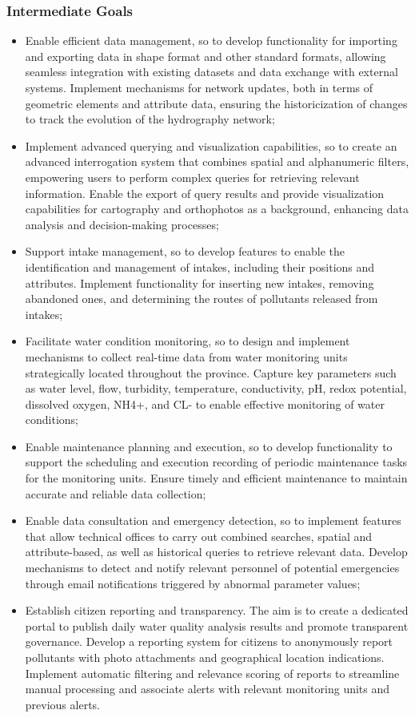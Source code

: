 \subsubsection{Intermediate Goals}
\begin{itemize}
    \item Enable efficient data management, so to develop functionality for importing and exporting data in shape format and other standard formats, allowing seamless integration with existing datasets and data exchange with external systems. Implement mechanisms for network updates, both in terms of geometric elements and attribute data, ensuring the historicization of changes to track the evolution of the hydrography network;
    \item Implement advanced querying and visualization capabilities, so to create an advanced interrogation system that combines spatial and alphanumeric filters, empowering users to perform complex queries for retrieving relevant information. Enable the export of query results and provide visualization capabilities for cartography and orthophotos as a background, enhancing data analysis and decision-making processes;
    \item Support intake management, so to develop features to enable the identification and management of intakes, including their positions and attributes. Implement functionality for inserting new intakes, removing abandoned ones, and determining the routes of pollutants released from intakes;
    \item Facilitate water condition monitoring, so to design and implement mechanisms to collect real-time data from water monitoring units strategically located throughout the province. Capture key parameters such as water level, flow, turbidity, temperature, conductivity, pH, redox potential, dissolved oxygen, NH4+, and CL- to enable effective monitoring of water conditions;
    \item Enable maintenance planning and execution, so to develop functionality to support the scheduling and execution recording of periodic maintenance tasks for the monitoring units. Ensure timely and efficient maintenance to maintain accurate and reliable data collection;
    \item Enable data consultation and emergency detection, so to implement features that allow technical offices to carry out combined searches, spatial and attribute-based, as well as historical queries to retrieve relevant data. Develop mechanisms to detect and notify relevant personnel of potential emergencies through email notifications triggered by abnormal parameter values;
    \item Establish citizen reporting and transparency. The aim is to create a dedicated portal to publish daily water quality analysis results and promote transparent governance. Develop a reporting system for citizens to anonymously report pollutants with photo attachments and geographical location indications. Implement automatic filtering and relevance scoring of reports to streamline manual processing and associate alerts with relevant monitoring units and previous alerts.
\end{itemize}


